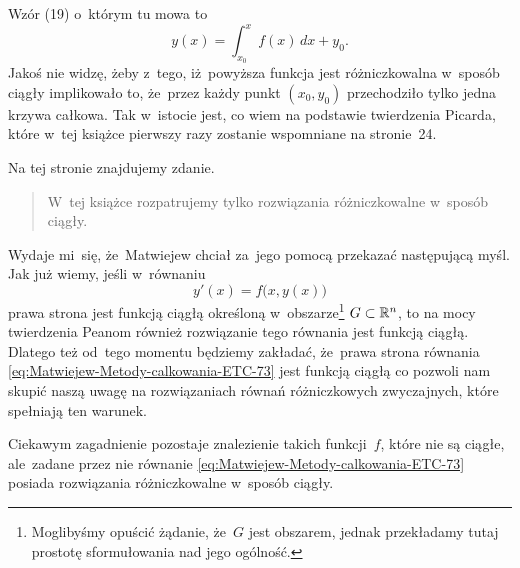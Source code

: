 \documentclass[a4paper,11pt]{article}
\numberwithin{equation}{section}
\begin{document}
\noindent
Wzór (19) o~którym tu mowa to
\begin{equation}
  \label{eq:Matwiejew-Metody-calkowania-ETC-72}
  y( x ) =
  \int_{ x_{ 0 } }^{ x } f( x ) \, dx + y_{ 0 }.
\end{equation}
Jakoś nie widzę, żeby z~tego, iż~powyższa funkcja jest różniczkowalna
w~sposób ciągły implikowało to, że~przez każdy punkt $( x_{ 0 }, y_{ 0 } )$
przechodziło tylko jedna krzywa całkowa. Tak w~istocie jest, co wiem na
podstawie twierdzenia Picarda, które w~tej książce pierwszy razy zostanie
wspomniane na stronie~24.

\VerSpaceFour





\noindent
{} Na tej stronie znajdujemy zdanie.





\begin{quote}

  W~tej książce rozpatrujemy tylko rozwiązania różniczkowalne w~sposób
  ciągły.

\end{quote}





\noindent
Wydaje mi~się, że~Matwiejew chciał za~jego pomocą przekazać następującą
myśl. Jak już wiemy, jeśli w~równaniu
\begin{equation}
  \label{eq:Matwiejew-Metody-calkowania-ETC-73}
  y'( x ) = f\big( x, y( x ) \big)
\end{equation}
prawa strona jest funkcją ciągłą określoną w~obszarze\footnote{Moglibyśmy
  opuścić żądanie, że~$G$ jest obszarem, jednak przekładamy tutaj
  prostotę sformułowania nad jego ogólność.}
$G \subset \mathbb{R}^{ n }$, to na mocy twierdzenia Peanom również rozwiązanie tego
równania jest funkcją ciągłą. Dlatego też od~tego momentu będziemy
zakładać, że~prawa strona równania
\eqref{eq:Matwiejew-Metody-calkowania-ETC-73} jest funkcją ciągłą
co pozwoli nam skupić naszą uwagę na rozwiązaniach równań różniczkowych
zwyczajnych, które spełniają ten warunek.

Ciekawym zagadnienie pozostaje znalezienie takich funkcji~$f$, które
nie są ciągłe, ale~zadane przez nie równanie
\eqref{eq:Matwiejew-Metody-calkowania-ETC-73} posiada rozwiązania
różniczkowalne w~sposób ciągły.

\VerSpaceFour
\end{document}
